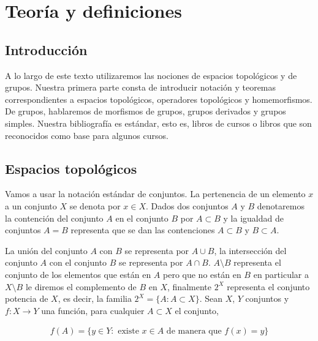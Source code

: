 

	


	




\chapter*{Teoría y definiciones}

\section*{Introducción}

A lo largo de este texto utilizaremos las nociones de espacios topológicos y de grupos. Nuestra primera parte consta de introducir notación y teoremas correspondientes a espacios topológicos, operadores topológicos y homemorfismos. De grupos, hablaremos de morfismos de grupos, grupos derivados y grupos simples. Nuestra bibliografía es estándar, esto es, libros de cursos o libros que son reconocidos como base para algunos cursos. 

\section*{Espacios topológicos}
 Vamos a usar la notación estándar de conjuntos. La pertenencia de un elemento $x$ a un conjunto $X$ se denota por $x \in X$. Dados dos conjuntos $A$ y $B$ denotaremos la contención del conjunto $A$ en el conjunto $B$ por $A \subset B$ y la igualdad de conjuntos $A=B$ representa que se dan las contenciones $A \subset B$ y $B \subset A$.

La unión del conjunto $A$ con $B$ se representa por $A \cup B$, la intersección del conjunto $A$ con el conjunto $B$ se representa por $A \cap B$. $A \setminus B$ representa el conjunto de los elementos que están en $A$ pero que no están en $B$ en particular a $X\setminus B$ le diremos el complemento de $B$ en $X$,  finalmente $2^X$ representa el conjunto potencia de $X$, es decir, la familia $2^X=\{A: A \subset X\}$.  Sean $X$, $Y$ conjuntos y $f:X \to Y$ una función, para cualquier $A \subset X$ el conjunto,
 
 \begin{align*}
 f(A)=\{y \in Y : \text{ existe }x \in A \text{ de manera que } f(x)=y\}
 \end{align*}

